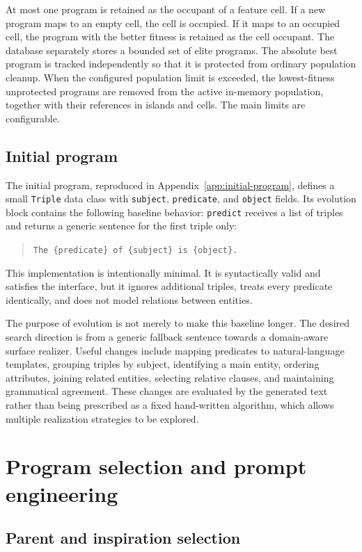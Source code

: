 At most one program is retained as the occupant of a feature cell. If a new
program maps to an empty cell, the cell is occupied. If it maps to an occupied
cell, the program with the better fitness is retained as the cell occupant.
The database separately stores a bounded set of elite programs. The absolute
best program is tracked independently so that it is protected from ordinary
population cleanup. When the configured population limit is exceeded, the
lowest-fitness unprotected programs are removed from the active in-memory
population, together with their references in islands and cells. The main limits are configurable.

\subsection{Initial program}

The initial program, reproduced in Appendix~\ref{app:initial-program}, defines a small \texttt{Triple} data class with
\texttt{subject}, \texttt{predicate}, and \texttt{object} fields. Its evolution
block contains the following baseline behavior: \texttt{predict} receives a
list of triples and returns a
generic sentence for the first triple only:
\begin{quote}
\texttt{The \{predicate\} of \{subject\} is \{object\}.}
\end{quote}
This implementation is intentionally minimal. It
is syntactically valid and satisfies the interface, but it ignores additional
triples, treats every predicate identically, and does not model relations
between entities.

The purpose of evolution is not merely to make this baseline longer. The
desired search direction is from a generic fallback sentence towards a
domain-aware surface realizer. Useful changes include mapping predicates to
natural-language templates, grouping triples by subject, identifying a main
entity, ordering attributes, joining related entities, selecting relative
clauses, and maintaining grammatical agreement. These changes are evaluated
by the generated text rather than being prescribed as a fixed hand-written
algorithm, which allows multiple realization strategies to be explored.

\section{Program selection and prompt engineering}
\label{sec:program-selection}

\subsection{Parent and inspiration selection}

